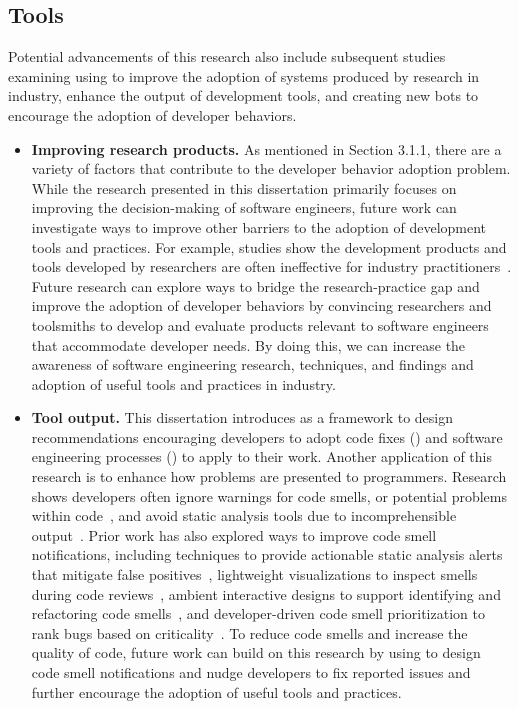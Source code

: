 \subsection{Tools}

Potential advancements of this research also include subsequent studies examining using \framework to improve the adoption of systems produced by research in industry, enhance the output of development tools, and creating new bots to encourage the adoption of developer behaviors.

\begin{itemize}
    \item \textbf{Improving research products.} As mentioned in Section 3.1.1, there are a variety of factors that contribute to the developer behavior adoption problem. While the research presented in this dissertation primarily focuses on improving the decision-making of software engineers, future work can investigate ways to improve other barriers to the adoption of development tools and practices. For example, studies show the development products and tools developed by researchers are often ineffective for industry practitioners~\cite{norman2010research,wohlin2013empirical}. Future research can explore ways to bridge the research-practice gap and improve the adoption of developer behaviors by convincing researchers and toolsmiths to develop and evaluate products relevant to software engineers that accommodate developer needs. By doing this, we can increase the awareness of software engineering research, techniques, and findings and adoption of useful tools and practices in industry.
    
    \item \textbf{Tool output.} This dissertation introduces \framework as a framework to design recommendations encouraging developers to adopt code fixes (\suggs) and software engineering processes (\tooltwo) to apply to their work. Another application of this research is to enhance how problems are presented to programmers. Research shows developers often ignore warnings for code smells, or potential problems within code~\cite{Yamashita2013CodeSmells}, and avoid static analysis tools due to incomprehensible output~\cite{Johnson2013Why}. Prior work has also explored ways to improve code smell notifications, including techniques to provide actionable static analysis alerts that mitigate false positives~\cite{Heckman2010Model}, lightweight visualizations to inspect smells during code reviews~\cite{Parnin2008CodeSmells}, ambient interactive designs to support identifying and refactoring code smells~\cite{MurphyHill2010CodeSmells}, and developer-driven code smell prioritization to rank bugs based on criticality~\cite{Pecorelli2020DDCodeSmells}. To reduce code smells and increase the quality of code, future work can build on this research by using \framework to design code smell notifications and nudge developers to fix reported issues and further encourage the adoption of useful tools and practices.


\end{itemize}
